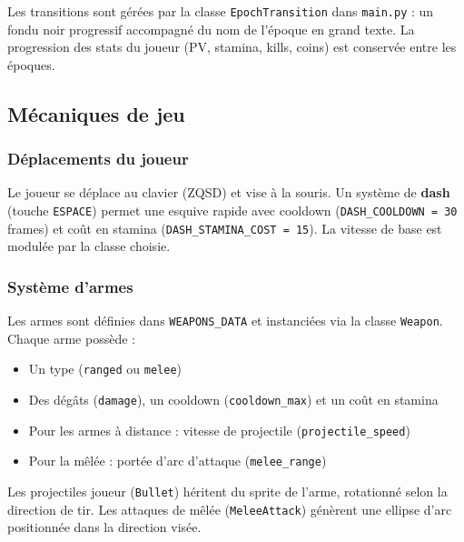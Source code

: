 \documentclass[12pt,a4paper]{article}
\begin{document}
Les transitions sont gérées par la classe \texttt{EpochTransition} dans \texttt{main.py} : un fondu noir progressif accompagné du nom de l'époque en grand texte. La progression des stats du joueur (PV, stamina, kills, coins) est conservée entre les époques.

\subsection{Mécaniques de jeu}

\subsubsection*{Déplacements du joueur}

Le joueur se déplace au clavier (ZQSD) et vise à la souris. Un système de \textbf{dash} (touche \texttt{ESPACE}) permet une esquive rapide avec cooldown (\texttt{DASH\_COOLDOWN = 30} frames) et coût en stamina (\texttt{DASH\_STAMINA\_COST = 15}). La vitesse de base est modulée par la classe choisie.

\subsubsection*{Système d'armes}

Les armes sont définies dans \texttt{WEAPONS\_DATA} et instanciées via la classe \texttt{Weapon}. Chaque arme possède :
\begin{itemize}[noitemsep, leftmargin=1.5em]
  \item Un type (\texttt{ranged} ou \texttt{melee})
  \item Des dégâts (\texttt{damage}), un cooldown (\texttt{cooldown\_max}) et un coût en stamina
  \item Pour les armes à distance : vitesse de projectile (\texttt{projectile\_speed})
  \item Pour la mêlée : portée d'arc d'attaque (\texttt{melee\_range})
\end{itemize}

Les projectiles joueur (\texttt{Bullet}) héritent du sprite de l'arme, rotationné selon la direction de tir. Les attaques de mêlée (\texttt{MeleeAttack}) génèrent une ellipse d'arc positionnée dans la direction visée.
\end{document}
